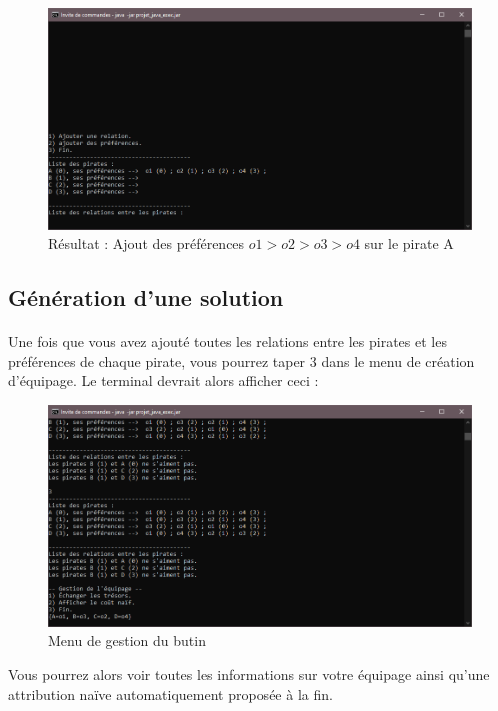 \documentclass[12pt]{article}
\begin{document}
\begin{figure}[H]
\includegraphics[width=16cm]{ajout_pref_3}
\centering
\caption{Résultat : Ajout des préférences $o1>o2>o3>o4$ sur le pirate A}
\end{figure}

\subsection{Génération d'une solution}
\paragraph{} Une fois que vous avez ajouté toutes les relations entre les pirates et les préférences de chaque pirate, vous pourrez taper 3 dans le menu de création d'équipage. Le terminal devrait alors afficher ceci :
\begin{figure}[H]
\includegraphics[width=16cm]{menu_gestion}
\centering
\caption{Menu de gestion du butin}
\end{figure}
Vous pourrez alors voir toutes les informations sur votre équipage ainsi qu'une attribution naïve automatiquement proposée à la fin.
\end{document}
